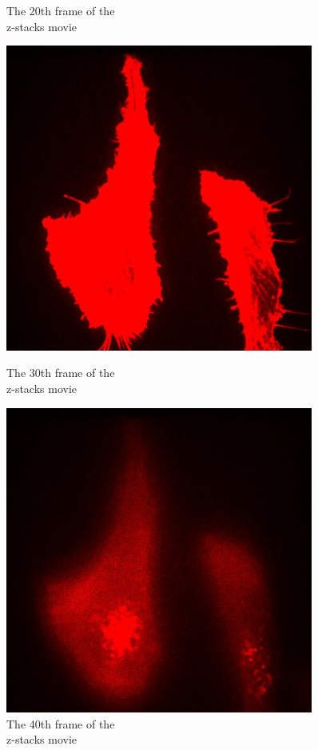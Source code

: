 \documentclass[a4paper,english,12pt,bibliography=totoc]{scrreprt}
\begin{document}
\begin{figure}[htbp]
\begin{minipage}[t]{0.5\linewidth}
        \caption{The 20th frame of the\\ z-stacks movie}
    \end{minipage}
\end{figure}

\begin{figure}[htbp]
    \begin{minipage}[t]{0.5\linewidth}
        \centering
        \includegraphics[width=0.9\textwidth]{Images/Actins/Actin_zscan_500nm_30.jpg}
        \caption{The 30th frame of the\\ z-stacks movie}
    \end{minipage}%
    \begin{minipage}[t]{0.5\linewidth}
        \centering
        \includegraphics[width=0.9\textwidth]{Images/Actins/Actin_zscan_500nm_40.jpg}
        \caption{The 40th frame of the\\ z-stacks movie}
    \end{minipage}
\end{figure}
\end{document}
